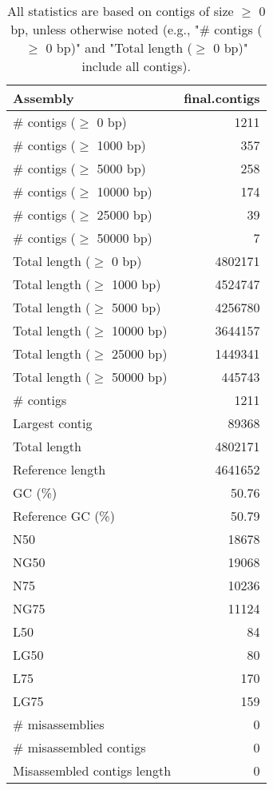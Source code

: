 \documentclass[12pt,a4paper]{article}
\begin{document}
\begin{table}[ht]
\begin{center}
\caption{All statistics are based on contigs of size $\geq$ 0 bp, unless otherwise noted (e.g., "\# contigs ($\geq$ 0 bp)" and "Total length ($\geq$ 0 bp)" include all contigs).}
\begin{tabular}{|l*{1}{|r}|}
\hline
Assembly & final.contigs \\ \hline
\# contigs ($\geq$ 0 bp) & 1211 \\ \hline
\# contigs ($\geq$ 1000 bp) & 357 \\ \hline
\# contigs ($\geq$ 5000 bp) & 258 \\ \hline
\# contigs ($\geq$ 10000 bp) & 174 \\ \hline
\# contigs ($\geq$ 25000 bp) & 39 \\ \hline
\# contigs ($\geq$ 50000 bp) & 7 \\ \hline
Total length ($\geq$ 0 bp) & 4802171 \\ \hline
Total length ($\geq$ 1000 bp) & 4524747 \\ \hline
Total length ($\geq$ 5000 bp) & 4256780 \\ \hline
Total length ($\geq$ 10000 bp) & 3644157 \\ \hline
Total length ($\geq$ 25000 bp) & 1449341 \\ \hline
Total length ($\geq$ 50000 bp) & 445743 \\ \hline
\# contigs & 1211 \\ \hline
Largest contig & 89368 \\ \hline
Total length & 4802171 \\ \hline
Reference length & 4641652 \\ \hline
GC (\%) & 50.76 \\ \hline
Reference GC (\%) & 50.79 \\ \hline
N50 & 18678 \\ \hline
NG50 & 19068 \\ \hline
N75 & 10236 \\ \hline
NG75 & 11124 \\ \hline
L50 & 84 \\ \hline
LG50 & 80 \\ \hline
L75 & 170 \\ \hline
LG75 & 159 \\ \hline
\# misassemblies & 0 \\ \hline
\# misassembled contigs & 0 \\ \hline
Misassembled contigs length & 0 \\ \hline

\end{tabular}
\end{center}
\end{table}
\end{document}
